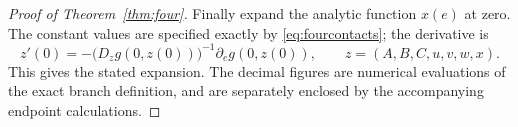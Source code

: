 \begin{proof}[Proof of Theorem~\ref{thm:four}]
Finally expand the analytic function $x(e)$ at zero. The constant values
are specified exactly by \eqref{eq:fourcontacts}; the derivative is
\[
 z'(0)=-\bigl(D_zg(0,z(0))\bigr)^{-1}\partial_e g(0,z(0)),
 \qquad z=(A,B,C,u,v,w,x).
\]
This gives the stated expansion. The decimal figures are numerical
evaluations of the exact branch definition, and are separately enclosed
by the accompanying endpoint calculations.
\end{proof}
